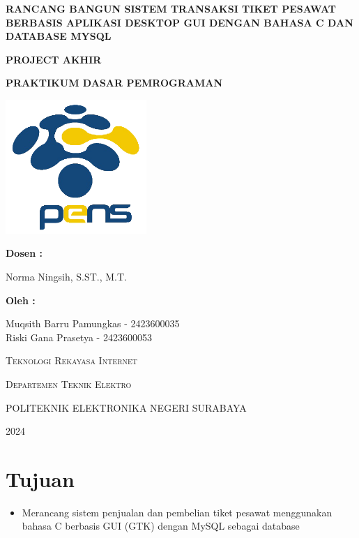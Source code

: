 \documentclass[a4paper,12pt]{article}
\begin{document}
\begin{titlepage}
    \centering
    {\large\bfseries RANCANG BANGUN SISTEM TRANSAKSI TIKET PESAWAT BERBASIS APLIKASI DESKTOP GUI DENGAN BAHASA C DAN DATABASE MYSQL\par}
    \vspace{0.3cm}
    {\large\bfseries PROJECT AKHIR\par}
    {\large\bfseries PRAKTIKUM DASAR PEMROGRAMAN\par}
    \vspace{2cm}
    \vspace*{0.5cm}
    \includegraphics[width=0.4\textwidth]{Logo_PENS.png}\par\vspace{1cm}
    \vspace{1cm}
    {\large\bfseries Dosen :\par}
    {\Large Norma Ningsih, S.ST., M.T.\par}
    \vspace{1cm}
    {\large\bfseries Oleh :\par}
    {\Large Muqsith Barru Pamungkas - 2423600035\\Riski Gana Prasetya - 2423600053\par}
    \vspace{1cm}
    {\scshape\LARGE Teknologi Rekayasa Internet \par}
    {\scshape\LARGE Departemen Teknik Elektro \par}
    \vspace{0.5cm}
    {\scshape\Large POLITEKNIK ELEKTRONIKA NEGERI SURABAYA\par}
    {\scshape\Large 2024\par}
    \vfill
\end{titlepage}

\section{Tujuan}
\label{sec:intro}

\begin{itemize}
    \item  Merancang sistem penjualan dan pembelian tiket pesawat menggunakan bahasa C berbasis GUI (GTK) dengan MySQL sebagai database
\end{itemize}
\end{document}
